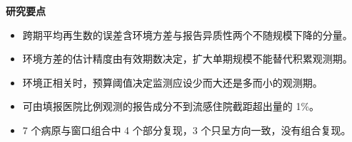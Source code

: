 \noindent\textbf{研究要点} %
\begin{itemize}[leftmargin=1.6em]
  \item 跨期平均再生数的误差含环境方差与报告异质性两个不随规模下降的分量。
  \item 环境方差的估计精度由有效期数决定，扩大单期规模不能替代积累观测期。
  \item 环境正相关时，预算阈值决定监测应设少而大还是多而小的观测期。
  \item 可由填报医院比例观测的报告成分不到流感住院截距超出量的 1\%。
  \item 7 个病原与窗口组合中 4 个部分复现，3 个只呈方向一致，没有组合复现。
\end{itemize}
\vspace{0.8em}
